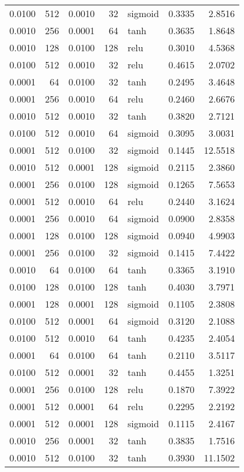 \begin{table}
\begin{tabular}{rrrrlrr}
0.0100 & 512 & 0.0010 & 32 & sigmoid & 0.3335 & 2.8516 \\
0.0010 & 256 & 0.0001 & 64 & tanh & 0.3635 & 1.8648 \\
0.0010 & 128 & 0.0100 & 128 & relu & 0.3010 & 4.5368 \\
0.0100 & 512 & 0.0010 & 32 & relu & 0.4615 & 2.0702 \\
0.0001 & 64 & 0.0100 & 32 & tanh & 0.2495 & 3.4648 \\
0.0001 & 256 & 0.0010 & 64 & relu & 0.2460 & 2.6676 \\
0.0010 & 512 & 0.0010 & 32 & tanh & 0.3820 & 2.7121 \\
0.0100 & 512 & 0.0010 & 64 & sigmoid & 0.3095 & 3.0031 \\
0.0001 & 512 & 0.0100 & 32 & sigmoid & 0.1445 & 12.5518 \\
0.0010 & 512 & 0.0001 & 128 & sigmoid & 0.2115 & 2.3860 \\
0.0001 & 256 & 0.0100 & 128 & sigmoid & 0.1265 & 7.5653 \\
0.0001 & 512 & 0.0010 & 64 & relu & 0.2440 & 3.1624 \\
0.0001 & 256 & 0.0010 & 64 & sigmoid & 0.0900 & 2.8358 \\
0.0001 & 128 & 0.0100 & 128 & sigmoid & 0.0940 & 4.9903 \\
0.0001 & 256 & 0.0100 & 32 & sigmoid & 0.1415 & 7.4422 \\
0.0010 & 64 & 0.0100 & 64 & tanh & 0.3365 & 3.1910 \\
0.0100 & 128 & 0.0100 & 128 & tanh & 0.4030 & 3.7971 \\
0.0001 & 128 & 0.0001 & 128 & sigmoid & 0.1105 & 2.3808 \\
0.0100 & 512 & 0.0001 & 64 & sigmoid & 0.3120 & 2.1088 \\
0.0100 & 512 & 0.0010 & 64 & tanh & 0.4235 & 2.4054 \\
0.0001 & 64 & 0.0100 & 64 & tanh & 0.2110 & 3.5117 \\
0.0100 & 512 & 0.0001 & 32 & tanh & 0.4455 & 1.3251 \\
0.0001 & 256 & 0.0100 & 128 & relu & 0.1870 & 7.3922 \\
0.0001 & 512 & 0.0001 & 64 & relu & 0.2295 & 2.2192 \\
0.0001 & 512 & 0.0001 & 128 & sigmoid & 0.1115 & 2.4167 \\
0.0010 & 256 & 0.0001 & 32 & tanh & 0.3835 & 1.7516 \\
0.0010 & 512 & 0.0100 & 32 & tanh & 0.3930 & 11.1502 \\

\end{tabular}
\end{table}
